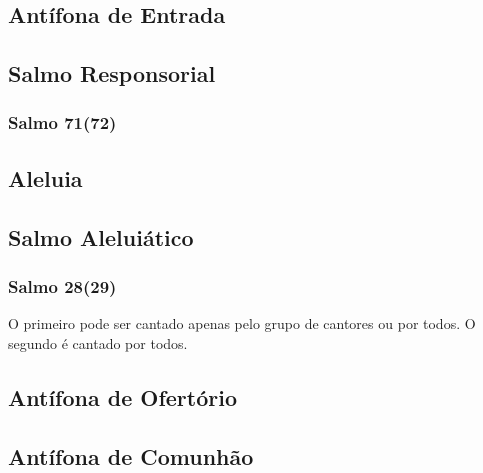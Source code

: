 \subsection{Antífona de Entrada}\label{subsection:tempus-nativitatis/in-epiphania-domini/introitus}

\AllowPageFlush

\subsection[Salmo Responsorial]{Salmo Responsorial}\label{subsection:tempus-nativitatis/in-epiphania-domini/psalmus-responsorius}
\subsubsection{Salmo 71(72)}

\AllowPageFlush

\subsection{Aleluia}\label{subsection:tempus-nativitatis/in-epiphania-domini/alleluia}

\AllowPageFlush

\subsection[Salmo Aleluiático]{Salmo Aleluiático}\label{subsection:tempus-nativitatis/in-epiphania-domini/psalmus-alleluiaticus}
\subsubsection{Salmo 28(29)}
\begin{rubrica}
  O primeiro {\normalfont\Rbar} pode ser cantado apenas pelo grupo de cantores ou por todos. O segundo {\normalfont\Rbar} é cantado por todos.
\end{rubrica}

\AllowPageFlush

\subsection{Antífona de Ofertório}\label{subsection:tempus-nativitatis/in-epiphania-domini/offertorium}

\AllowPageBreak

\subsection{Antífona de Comunhão}\label{subsection:tempus-nativitatis/in-epiphania-domini/communio}

\AllowPageFlush